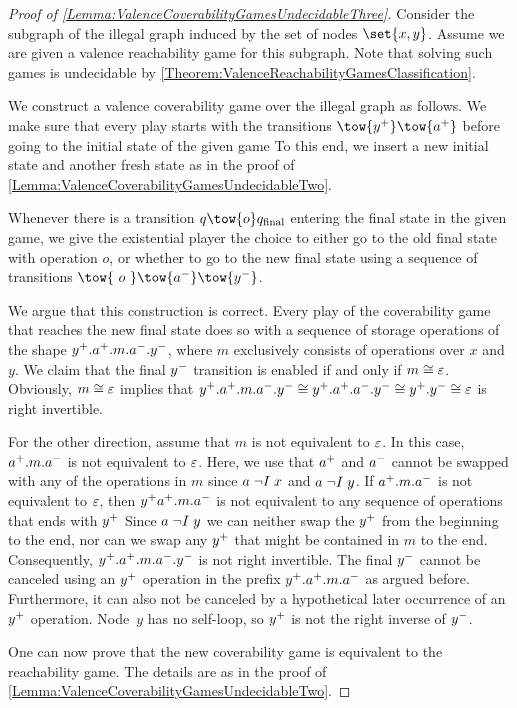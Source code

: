 \documentclass[../../diss.tex]{subfiles}
\begin{document}
\begin{proof}[Proof of \cref{Lemma:ValenceCoverabilityGamesUndecidableThree}]
    Consider the subgraph of the  illegal graph induced by the set of nodes $\set{x,y}$.
    Assume we are given a valence reachability game for this subgraph.
    Note that solving such games is undecidable by \cref{Theorem:ValenceReachabilityGamesClassification}.

    We construct a valence coverability game over the  illegal graph as follows.
    We make sure that every play starts with the transitions $\tow{\inc{y}} \tow{\inc{a}}$ before going to the initial state of the given game
    To this end, we insert a new initial state and another fresh state as in the proof of \cref{Lemma:ValenceCoverabilityGamesUndecidableTwo}.

    Whenever there is a transition $q \tow{o} \qfinal$ entering the final state in the given game, we give the existential player the choice to either go to the old final state with operation $o$, or whether to go to the new final state using a sequence of transitions $\tow{\ o\ } \tow{\dec{a}} \tow{\dec{y}}$.

    We argue that this construction is correct.
    Every play of the coverability game that reaches the new final state does so with a sequence of storage operations of the shape ${y}^+.{a}^+.m.{a}^-.{y}^-$, where $m$ exclusively consists of operations over $x$ and $y$.
    We claim that the final ${y}^-$ transition is enabled if and only if $m \cong \varepsilon$.
    Obviously, $m \cong \varepsilon$ implies that ${y}^+.{a}^+.m.{a}^-.{y}^- \cong {y}^+.{a}^+.{a}^-.{y}^- \cong {y}^+.{y}^- \cong \varepsilon$ is right invertible.

    For the other direction, assume that $m$ is not equivalent to $\varepsilon$.
    In this case, ${a}^+.m.{a}^-$ is not equivalent to $\varepsilon$.
    Here, we use that ${a}^+$ and ${a}^-$ cannot be swapped with any of the operations in $m$ since $a \mathrel{\neg I} x$ and $a \mathrel{\neg I} y$.
    If ${a}^+.m.{a}^-$ is not equivalent to $\varepsilon$, then ${y}^+{a}^+.m.{a}^-$ is not equivalent to any sequence of operations that ends with ${y}^+$
    Since $a \mathrel{\neg I} y$ we can neither swap the ${y}^+$ from the beginning to the end, nor can we swap any ${y}^+$ that might be contained in $m$ to the end.
    Consequently, ${y}^+.{a}^+.m.{a}^-.{y}^-$ is not right invertible.
    The final ${y}^-$ cannot be canceled using an ${y}^+$ operation in the prefix ${y}^+.{a}^+.m.{a}^-$ as argued before.
    Furthermore, it can also not be canceled by a hypothetical later occurrence of an ${y}^+$ operation.
    Node~$y$ has no self-loop, so ${y}^+$ is not the right inverse of ${y}^-$.

    One can now prove that the new coverability game is equivalent to the reachability game.
    The details are as in the proof of \cref{Lemma:ValenceCoverabilityGamesUndecidableTwo}.
\end{proof}
\end{document}
